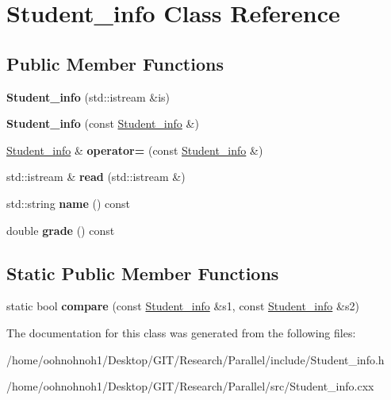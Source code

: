 \hypertarget{classStudent__info}{}\section{Student\+\_\+info Class Reference}
\label{classStudent__info}
\subsection*{Public Member Functions}
\begin{DoxyCompactItemize}
\item 
\mbox{\label{classStudent__info_a09c06b7959456c8f0f966aca0e937ba9}} 
{\bfseries Student\+\_\+info} (std\+::istream \&is)
\item 
\mbox{\label{classStudent__info_a5898dcdf6fa4b0a3fc47d84d9a0662c1}} 
{\bfseries Student\+\_\+info} (const \hyperlink{classStudent__info}{Student\+\_\+info} \&)
\item 
\mbox{\label{classStudent__info_a3240356d42e140117ce99c238904ed88}} 
\hyperlink{classStudent__info}{Student\+\_\+info} \& {\bfseries operator=} (const \hyperlink{classStudent__info}{Student\+\_\+info} \&)
\item 
\mbox{\label{classStudent__info_aedf8317be1f5ba6f3747070f8753d5a0}} 
std\+::istream \& {\bfseries read} (std\+::istream \&)
\item 
\mbox{\label{classStudent__info_a895ffb71a04a15baac6493bd70530d3f}} 
std\+::string {\bfseries name} () const
\item 
\mbox{\label{classStudent__info_aa747a026fde190bcf679e57a492060b4}} 
double {\bfseries grade} () const
\end{DoxyCompactItemize}
\subsection*{Static Public Member Functions}
\begin{DoxyCompactItemize}
\item 
\mbox{\label{classStudent__info_a4b7118b78d60f4d8a5c51b5ea1b94494}} 
static bool {\bfseries compare} (const \hyperlink{classStudent__info}{Student\+\_\+info} \&s1, const \hyperlink{classStudent__info}{Student\+\_\+info} \&s2)
\end{DoxyCompactItemize}


The documentation for this class was generated from the following files\+:\begin{DoxyCompactItemize}
\item 
/home/oohnohnoh1/\+Desktop/\+G\+I\+T/\+Research/\+Parallel/include/Student\+\_\+info.\+h\item 
/home/oohnohnoh1/\+Desktop/\+G\+I\+T/\+Research/\+Parallel/src/Student\+\_\+info.\+cxx\end{DoxyCompactItemize}
